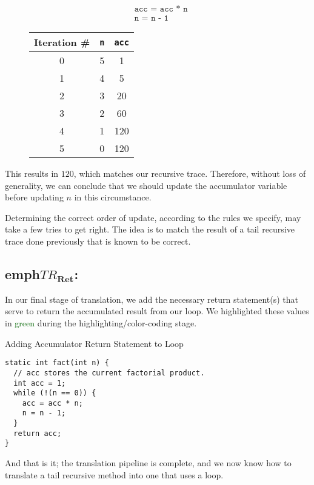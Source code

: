 \begin{figure}[H]
\centering
\begin{minipage}{.4\textwidth}
  \begin{align*}
  &\texttt{acc = acc * n}\\
  &\texttt{n = n - 1}
  \end{align*}
\end{minipage}%
\begin{minipage}{.4\textwidth}
\begin{tabular}{c|c|c}
Iteration \# & \texttt{n} & \texttt{acc}\\
\hline
\hline
0 & 5 & 1\\
\hline
1 & 4 & 5\\
\hline
2 & 3 & 20\\
\hline
3 & 2 & 60\\
\hline
4 & 1 & 120\\
\hline
5 & 0 & 120\\
\end{tabular}
\end{minipage}
\end{figure}
This results in $120$, which matches our recursive trace. Therefore, without loss of generality, we can conclude that we should update the accumulator variable before updating $n$ in this circumstance.

Determining the correct order of update, according to the rules we specify, may take a few tries to get right. The idea is to match the result of a tail recursive trace done previously that is known to be correct.

\subsection{emph{$TR_\mathbf{Ret}$}:}
In our final stage of translation, we add the necessary return statement(s) that serve to return the accumulated result from our loop. We highlighted these values in \textcolor{darkgreen}{green} during the highlighting/color-coding stage.
\begin{cl}[]{Adding Accumulator Return Statement to Loop}
\begin{lstlisting}[language=MyJava]
static int fact(int n) {
  // acc stores the current factorial product. 
  int acc = 1;
  while (!(n == 0)) { 
    acc = acc * n;
    n = n - 1;
  }
  return acc;
}
\end{lstlisting}
\end{cl}

And that is it; the translation pipeline is complete, and we now know how to translate a tail recursive method into one that uses a loop.

